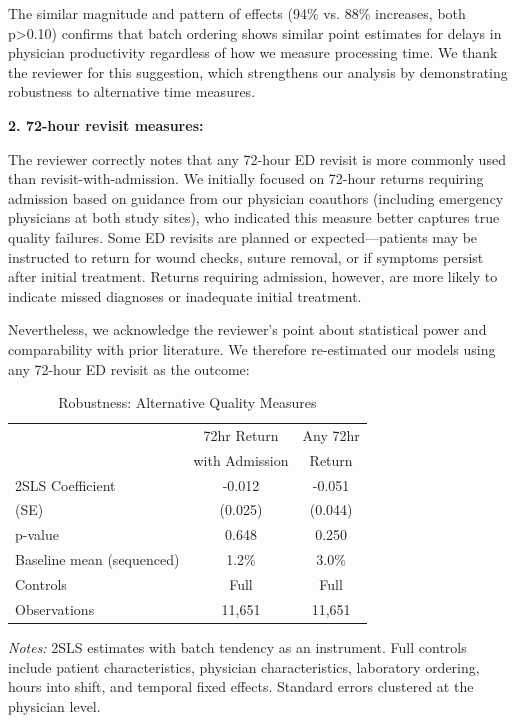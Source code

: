 \documentclass[11pt]{article}
\newcommand{\1}{\hbox{\rm 1\kern-.35em 1}}
\begin{document}
The similar magnitude and pattern of effects (94\% vs. 88\% increases, both p>0.10) confirms that batch ordering shows similar point estimates for delays in physician productivity regardless of how we measure processing time. We thank the reviewer for this suggestion, which strengthens our analysis by demonstrating robustness to alternative time measures.

\textbf{2. 72-hour revisit measures:} 

The reviewer correctly notes that any 72-hour ED revisit is more commonly used than revisit-with-admission. We initially focused on 72-hour returns requiring admission based on guidance from our physician coauthors (including emergency physicians at both study sites), who indicated this measure better captures true quality failures. Some ED revisits are planned or expected—patients may be instructed to return for wound checks, suture removal, or if symptoms persist after initial treatment. Returns requiring admission, however, are more likely to indicate missed diagnoses or inadequate initial treatment.

Nevertheless, we acknowledge the reviewer's point about statistical power and comparability with prior literature. We therefore re-estimated our models using any 72-hour ED revisit as the outcome:

\begin{table}[H]
\centering
\caption*{Robustness: Alternative Quality Measures}
\begin{threeparttable}
\begin{tabular}{lcc}
\toprule 
& 72hr Return & Any 72hr \\ 
& with Admission & Return \\ 
\midrule
2SLS Coefficient & -0.012 & -0.051 \\
(SE) & (0.025) & (0.044) \\
p-value & 0.648 & 0.250 \\
\midrule
Baseline mean (sequenced) & 1.2\% & 3.0\% \\
\midrule
Controls & Full & Full \\
Observations & 11,651 & 11,651 \\
\bottomrule
\end{tabular}
\begin{tablenotes}
\footnotesize
\item \textit{Notes:} 2SLS estimates with batch tendency as an instrument. Full controls include patient characteristics, physician characteristics, laboratory ordering, hours into shift, and temporal fixed effects. Standard errors clustered at the physician level.
\end{tablenotes}
\end{threeparttable}
\end{table}
\end{document}

